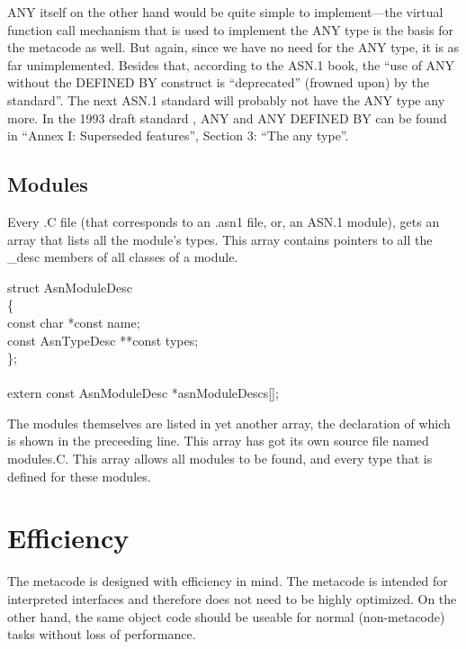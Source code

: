 ANY itself on the other hand would be quite simple to implement---the virtual function call mechanism that is used to implement the ANY type is the basis for the metacode as well.
But again, since we have no need for the ANY type, it is as far unimplemented.
Besides that, according to the ASN.1 book, the ``use of ANY without the DEFINED BY construct is ``deprecated'' (frowned upon) by the standard''.
The next ASN.1 standard will probably not have the ANY type any more.
In the 1993 draft standard \cite{asn1:1993}, ANY and ANY DEFINED BY can be found in ``Annex I: Superseded features'', Section 3: ``The any type''.

\subsection{\label{meta-modules-sect}Modules}

Every {\ufn .C} file (that corresponds to an {\ufn .asn1} file, or, an ASN.1 module), gets an array that lists all the module's types.
This array contains pointers to all the {\C \_desc} members of all classes of a module.

\begin{Ccode}
struct AsnModuleDesc\\
\{\+\\
  const char			\>\>*const name;\\
  const AsnTypeDesc		\>\>**const types;\-\\
\};\\
\\
extern const AsnModuleDesc	\>\>\>*asnModuleDescs[];
\end{Ccode}

The modules themselves are listed in yet another array, the declaration of which is shown in the preceeding line.
This array has got its own source file named {\ufn modules.C}.
This array allows all modules to be found, and every type that is defined for these modules.

\section{Efficiency}

The metacode is designed with efficiency in mind.
The metacode is intended for interpreted interfaces and therefore does not need to be highly optimized.
On the other hand, the same object code should be useable for normal (non-metacode) tasks without loss of performance.

